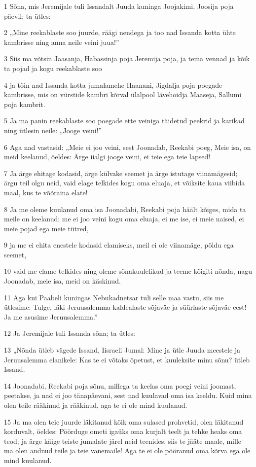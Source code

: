 \par 1 Sõna, mis Jeremijale tuli Issandalt Juuda kuninga Joojakimi, Joosija poja päevil; ta ütles:
\par 2 „Mine reekablaste soo juurde, räägi nendega ja too nad Issanda kotta ühte kambrisse ning anna neile veini juua!”
\par 3 Siis ma võtsin Jaasanja, Habassinja poja Jeremija poja, ja tema vennad ja kõik ta pojad ja kogu reekablaste soo
\par 4 ja tõin nad Issanda kotta jumalamehe Haanani, Jigdalja poja poegade kambrisse, mis on vürstide kambri kõrval ülalpool lävehoidja Maaseja, Sallumi poja kambrit.
\par 5 Ja ma panin reekablaste soo poegade ette veiniga täidetud peekrid ja karikad ning ütlesin neile: „Jooge veini!”
\par 6 Aga nad vastasid: „Meie ei joo veini, sest Joonadab, Reekabi poeg, Meie isa, on meid keelanud, öeldes: Ärge iialgi jooge veini, ei teie ega teie lapsed!
\par 7 Ja ärge ehitage kodasid, ärge külvake seemet ja ärge istutage viinamägesid; ärgu teil olgu neid, vaid elage telkides kogu oma eluaja, et võiksite kaua viibida maal, kus te võõraina elate!
\par 8 Ja me oleme kuulanud oma isa Joonadabi, Reekabi poja häält kõiges, mida ta meile on keelanud: me ei joo veini kogu oma eluaja, ei me ise, ei meie naised, ei meie pojad ega meie tütred,
\par 9 ja me ei ehita enestele kodasid elamiseks, meil ei ole viinamäge, põldu ega seemet,
\par 10 vaid me elame telkides ning oleme sõnakuulelikud ja teeme kõigiti nõnda, nagu Joonadab, meie isa, meid on käskinud.
\par 11 Aga kui Paabeli kuningas Nebukadnetsar tuli selle maa vastu, siis me ütlesime: Tulge, läki Jeruusalemma kaldealaste sõjaväe ja süürlaste sõjaväe eest! Ja me asusime Jeruusalemma.”
\par 12 Ja Jeremijale tuli Issanda sõna; ta ütles:
\par 13 „Nõnda ütleb vägede Issand, Iisraeli Jumal: Mine ja ütle Juuda meestele ja Jeruusalemma elanikele: Kas te ei võtaks õpetust, et kuuleksite minu sõnu? ütleb Issand.
\par 14 Joonadabi, Reekabi poja sõnu, millega ta keelas oma poegi veini joomast, peetakse, ja nad ei joo tänapäevani, sest nad kuulavad oma isa keeldu. Kuid mina olen teile rääkinud ja rääkinud, aga te ei ole mind kuulanud.
\par 15 Ja ma olen teie juurde läkitanud kõik oma sulased prohvetid, olen läkitanud korduvalt, öeldes: Pöörduge ometi igaüks oma kurjalt teelt ja tehke heaks oma teod; ja ärge käige teiste jumalate järel neid teenides, siis te jääte maale, mille ma olen andnud teile ja teie vanemaile! Aga te ei ole pööranud oma kõrva ega ole mind kuulanud.

